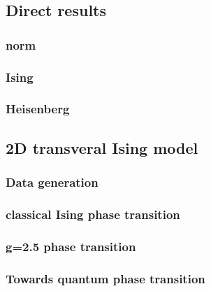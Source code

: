 \subsection{Direct results}

\subsubsection{norm}

\subsubsection{Ising}

\subsubsection{Heisenberg}

\subsection{2D transveral Ising model}

\subsubsection{Data generation}

\subsubsection{classical Ising phase transition}

\subsubsection{ g=2.5 phase transition }

\subsubsection{ Towards quantum phase transition }